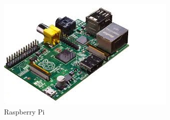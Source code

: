 \documentclass{peno-opdracht2}
\begin{document}
\begin{figure}

\begin{center}
\includegraphics[scale=0.6]{raspb.png}
\end{center}
\caption{Raspberry Pi}
\end{figure}
\end{document}
